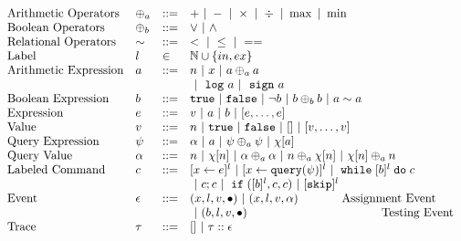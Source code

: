 \[
\begin{array}{llll}
\mbox{Arithmetic Operators} 
& \oplus_a & ::= & + ~|~ - ~|~ \times 
%
~|~ \div ~|~ \max ~|~ \min\\  
\mbox{Boolean Operators} 
& \oplus_b & ::= & \lor ~|~ \land
\\
%
\mbox{Relational Operators} 
& \sim & ::= & < ~|~ \leq ~|~ == 
\\  
%
\mbox{Label} 
& l & \in & \mathbb{N} \cup \{in, ex\} 
\\ 
%
\mbox{Arithmetic Expression} 
& \aexpr & ::= & 
n ~|~ {x} ~|~ \aexpr \oplus_a \aexpr  
\\
&  &  & 
 ~|~ \elog \aexpr  ~|~ \esign \aexpr
\\
%
\mbox{Boolean Expression} & \bexpr & ::= & 
%
\etrue ~|~ \efalse  ~|~ \neg \bexpr
 ~|~ \bexpr \oplus_b \bexpr
%
~|~ \aexpr \sim \aexpr 
\\
%
\mbox{Expression} & \expr & ::= & v ~|~ \aexpr ~|~ \bexpr ~|~ [\expr, \dots, \expr]
\\  
%
\mbox{Value} 
& v & ::= & { n ~|~ \etrue ~|~ \efalse ~|~ [] ~|~ [v, \dots, v]}  
\\
%
\mbox{Query Expression} 
& {\qexpr} & ::= 
& { \qval ~|~ \aexpr ~|~ \qexpr \oplus_a \qexpr ~|~ \chi[\aexpr]} 
\\
%
\mbox{Query Value} & \qval & ::= 
& {n ~|~ \chi[n] ~|~ \qval \oplus_a  \qval ~|~ n \oplus_a  \chi[n]
    ~|~ \chi[n] \oplus_a  n}
    \\
\mbox{Labeled Command} 
& {c} & ::= &   [\assign {{x}}{ {\expr}}]^{l} ~|~  [\assign {{x} } {{\query(\qexpr)}}]^{l}
~|~ {\ewhile [ \bexpr ]^{l} \edo {c} }
\\
&&&
~|~ {c};{c}  
~|~ \eif([\bexpr]{}^l , {c}, {c}) 
~|~ [\eskip]^l
\\ 
\mbox{Event} 
& \event & ::= & 
    ({x}, l, v, \bullet) ~|~ ({x}, l, v, \qval)  ~~~~~~~~~~~ \mbox{Assignment Event} \\
&&& ~|~(\bexpr, l, v, \bullet)   ~~~~~~~~~~~~~~~~~~~~~~~~~~~~~~~~~~ \mbox{Testing Event}
\\
\mbox{Trace} & \trace
& ::= & [] ~|~ \trace :: \event
\\
\end{array}
\]
